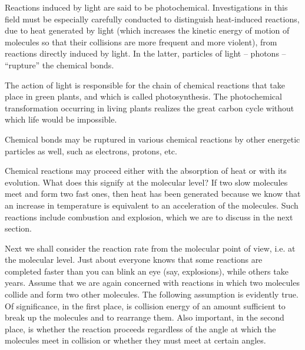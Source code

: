 Reactions induced by light are said to be photochemical. Investigations in this field must be especially carefully conducted to distinguish heat-induced reactions, due to heat generated by light (which increases the kinetic ener­gy of motion of molecules so that their collisions are more frequent and more violent), from reactions directly induced by light. In the latter, particles of light -- pho­tons -- ``rupture'' the chemical bonds.

The action of light is responsible for the chain of chem­ical reactions that take place in green plants, and which is called photosynthesis. The photochemical transforma­tion occurring in living plants realizes the great carbon cycle without which life would be impossible.

Chemical bonds may be ruptured in various chemical reactions by other energetic particles as well, such as electrons, protons, etc.

Chemical reactions may proceed either with the absorp­tion of heat or with its evolution. What does this signify at the molecular level? If two slow molecules meet and form two fast ones, then heat has been generated because we know that an increase in temperature is equivalent to an acceleration of the molecules. Such reactions include combustion and explosion, which we are to discuss in the next section.

Next we shall consider the reaction rate from the molec­ular point of view, i.e. at the molecular level. Just about everyone knows that some reactions are completed faster than you can blink an eye (say, explosions), while others take years. Assume that we are again concerned with reactions in which two molecules collide and form two other molecules. The following assumption is evidently true. Of significance, in the first place, is collision energy of an amount sufficient to break up the molecules and to rearrange them. Also important, in the second place, is whether the reaction proceeds regardless of the angle at which the molecules meet in collision or whether they must meet at certain angles.

